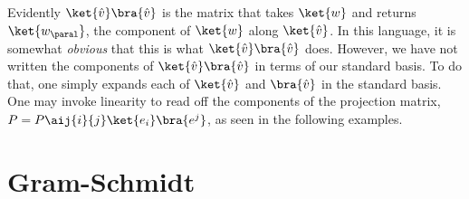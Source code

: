 Evidently $\ket{\hat{v}} \bra{\hat{v}}$ is the matrix that takes $\ket{w}$ and returns $\ket{w_\paral}$, the component of $\ket{w}$ along $\ket{\hat{v}}$. In this language, it is somewhat \emph{obvious} that this is what $\ket{\hat{v}} \bra{\hat{v}}$ does. However, we have not written the components of $\ket{\hat{v}} \bra{\hat{v}}$ in terms of our standard basis. To do that, one simply expands each  of $\ket{\hat{v}}$ and $\bra{\hat{v}}$ in the standard basis. One may invoke linearity to read off the components of the projection matrix, $P = P\aij{i}{j}\ket{e_i}\bra{e^j}$, as seen in the following examples. 





\section{Gram-Schmidt}


